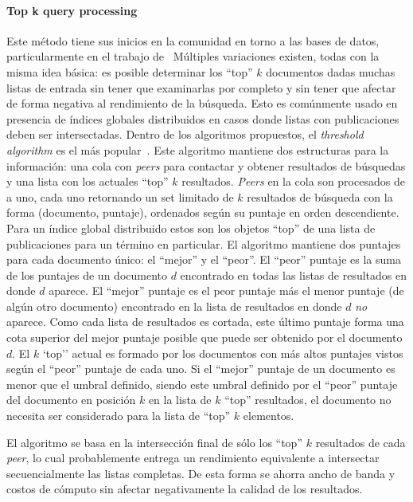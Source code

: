 \paragraph{Top k query processing~\cite{suel2003odissea, balke2005progressive, michel2005klee, zhang2005efficient}} %
Este método tiene sus inicios en la comunidad en torno a las bases de datos,
particularmente en el trabajo de~\citealt{fagin2001optimal} %
Múltiples variaciones existen, todas con la misma idea básica: es posible
determinar los ``top'' $k$ documentos dadas muchas listas de entrada sin tener
que examinarlas por completo y sin tener que afectar de forma negativa al
rendimiento de la búsqueda. Esto es comúnmente usado en presencia de índices
globales distribuidos en casos donde listas con publicaciones deben ser intersectadas.
Dentro de los algoritmos propuestos, el \textit{threshold algorithm} es el más
popular~\citealt{michel2005klee, suel2003odissea}. %
Este algoritmo mantiene dos estructuras para la información: una cola con
\textit{peers} para contactar y obtener resultados de búsquedas y una lista con
los actuales ``top'' $k$ resultados. \textit{Peers} en la cola son procesados
de a uno, cada uno retornando un set limitado de $k$ resultados de búsqueda con
la forma (documento, puntaje), ordenados según su puntaje en orden descendiente.
Para un índice global distribuido estos son los objetos ``top'' de una lista de
publicaciones para un término en particular. El algoritmo mantiene dos puntajes
para cada documento único: el ``mejor'' y el ``peor''. El ``peor'' puntaje es la suma de
los puntajes de un documento $d$ encontrado en todas las listas de resultados en
donde $d$ aparece. El ``mejor'' puntaje es el peor puntaje más el menor puntaje
(de algún otro documento) encontrado en la lista de resultados en donde $d$
\textit{no} aparece. Como cada lista de resultados es cortada, este último
puntaje forma una cota superior del mejor puntaje posible que puede ser obtenido
por el documento $d$. El $k$ `top'' actual  es formado por los documentos con más altos
puntajes vistos según el ``peor'' puntaje de cada uno. Si el ``mejor'' puntaje
de un documento es menor que el umbral definido, siendo este umbral definido por el ``peor'' puntaje del
documento en posición $k$ en la lista de $k$ ``top'' resultados, el documento no
necesita ser considerado para la lista de ``top'' $k$ elementos.

El algoritmo se basa en la intersección final de sólo los ``top'' $k$ resultados
de cada \textit{peer}, lo cual probablemente entrega un rendimiento equivalente
a intersectar secuencialmente las listas completas. De esta forma se ahorra
ancho de banda y costos de cómputo sin afectar negativamente la calidad de los
resultados.

